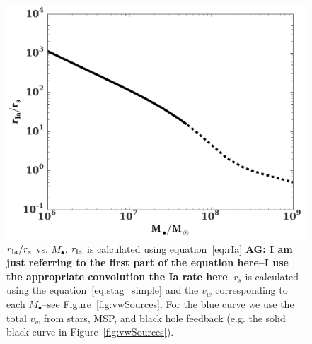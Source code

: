 \documentclass[usenatbib,fleqn]{mn2e}
\newcommand\lsim{\mathrel{\rlap{\lower4pt\hbox{\hskip1pt$\sim$}}
    \raise1pt\hbox{$<$}}}
\newcommand{\rs}{r_s}
\newcommand{\Mbh}[1][]{M_{\bullet#1}}
\newcommand{\rIa}{r_{\rm Ia}}
\newcommand{\vwO}{v_{w}}
\newcommand{\tage}{t_{\star}}
\begin{document}
\begin{figure}
\includegraphics[width=\columnwidth]{rs_rIa.pdf}
\caption{\label{fig:rs_rIa} $\rIa/\rs$ vs. $\Mbh$. $\rIa$ is
  calculated using equation~\eqref{eq:rIa} {\bf AG: I am just
    referring to the first part of the equation here--I use the
    appropriate convolution the Ia rate here}. $\rs$ is calculated
  using the equation~\eqref{eq:stag_simple} and the $\vwO$
  corresponding to each $\Mbh$--see Figure~\ref{fig:vwSources}. For
  the blue curve we use the total $\vwO$ from stars, MSP, and
  black hole feedback (e.g. the solid black curve in
  Figure~\ref{fig:vwSources}).}
\end{figure}

\end{document}
